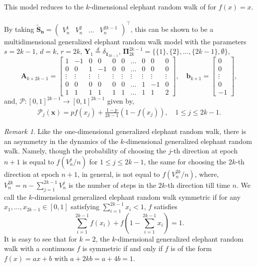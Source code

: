 \documentclass[12pt]{amsart}
\theoremstyle{plain}
\theoremstyle{remark}
\newtheorem{remark}[theorem]{Remark}
\numberwithin{equation}{section}
\begin{document}
This model reduces to the $k$-dimensional elephant random walk of \cite{bercu2019multi} for $f(x) = x$.\\\\
By taking $\boldsymbol{\widetilde{S}_n} = \begin{pmatrix}
    V^1_n & V^2_n & \ldots & V^{2k-1}_n
\end{pmatrix}^{\top}$, this can be shown to be a multidimensional generalized elephant random walk model with the parameters $s = 2k-1$, $d = k$, $r = 2k$, $\boldsymbol{Y}_1 \stackrel{d}{=} \delta_{\boldsymbol{1}_{2k-1}}$, $\boldsymbol{\Pi}^{2k-1}_{2k} = \{\{1\}, \{2\}, \ldots, \{2k-1\},\emptyset\}$, {\[\boldsymbol{A}_{k\times 2k-1} = \begin{bmatrix} 1 & -1 & 0 & 0 & 0 & 0 &\ldots & 0 & 0 & 0 \\ 0 & 0 & 1 & -1 & 0 & 0 & \ldots & 0 & 0 & 0\\ \vdots & \vdots & \vdots & \vdots & \vdots & \vdots & \vdots & \vdots & \vdots & \vdots \\ 0 & 0 & 0 & 0 & 0 & 0 & \ldots & 1 & -1 & 0 \\ 1 & 1 & 1 & 1 & 1 & 1 & \ldots &1 & 1 & 2 \end{bmatrix}, \quad \boldsymbol{b}_{k\times 1} = \begin{bmatrix}
    0 \\ 0 \\ \vdots \\ 0 \\ -1 
\end{bmatrix},\]} and, $\boldsymbol{\mathcal{P}} : [0,1]^{2k-1} \to [0,1]^{2k-1}$ given by, 
\begin{align*}{\mathcal{P}}_j(\boldsymbol{x}) = pf(x_j) + \frac{1-p}{2k-1}(1-f(x_j)), \quad 1 \leq j \leq 2k-1.\end{align*}

\begin{remark}
    Like the one-dimensional generalized elephant random walk, there is an asymmetry in the dynamics of the $k$-dimensional generalized elephant random walk. Namely, though the probability of choosing the $j$-th direction at epoch $n + 1$ is equal to $f(V^j_n/n)$ for $1 \leq j \leq 2k-1$, the same for choosing the $2k$-th direction at epoch $n + 1$, in general, is not equal to $f(V^{2k}_n/n)$, where, $V^{2k}_n = n - \sum_{j=1}^{2k-1}V^j_n$ is the number of steps in the $2k$-th direction till time $n$. We call the $k$-dimensional generalized elephant random walk symmetric if for any $x_1, \ldots, x_{2k-1} \in [0,1]$ satisfying $\sum_{i=1}^{2k-1}x_i < 1$, $f$ satisfies \[\sum_{i=1}^{2k-1}f(x_i)+f\left(1-\sum_{i=1}^{2k-1}x_i\right)  = 1.\] It is easy to see that for $k =2$, the $k$-dimensional generalized elephant random walk with a continuous $f$ is symmetric if and only if $f$ is of the form $f(x) = ax+b$ with $a+2kb = a+4b = 1$.
\end{remark}
\end{document}
